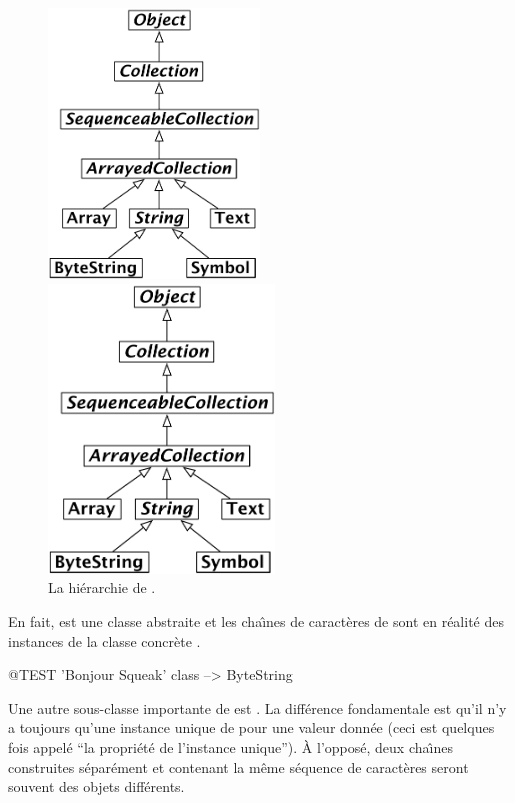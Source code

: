 \documentclass[a4paper,10pt,twoside]{book}
\begin{document}
\begin{figure}[ht]
\ifluluelse
	{\centerline {\includegraphics[width=0.5\textwidth]{StringHierarchy}}}
	{\centerline {\includegraphics[width=6cm]{StringHierarchy}}}
\caption{La hi\'erarchie de .\label{fig:strings}}
\end{figure}

En fait,  est une classe abstraite et les cha\^{\i}nes de caract\`eres de \sq sont en r\'ealit\'e des instances de la classe concr\`ete .

\begin{code}{@TEST}
'Bonjour Squeak' class --> ByteString
\end{code}

Une autre sous-classe importante de  est
.  La diff\'erence fondamentale est qu'il n'y a
toujours qu'une instance unique de  pour une valeur
donn\'ee  (ceci est quelques fois appel\'e ``la propri\'et\'e de
l'instance unique'').  \`A l'oppos\'e, deux cha\^{\i}nes construites
s\'epar\'ement  et contenant la m\^eme s\'equence de caract\`eres
seront souvent des objets diff\'erents.
\end{document}
